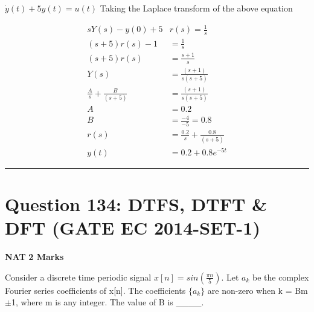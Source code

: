 \documentclass[11pt,a4paper]{article}
\begin{document}
\begin{tcolorbox}[solbox, title=Detailed Solution -- Question 133]
$\dot{y}(t)+5 y(t)=u(t)$
 Taking the Laplace transform of the above equation

\[
\begin{aligned} s Y(s)-y(0)+5 & r(s)=\frac{1}{s} \\ (s+5) r(s)-1 & =\frac{1}{s} \\ (s+5) r(s) & =\frac{s+1}{s} \\ Y(s) & =\frac{(s+1)}{s(s+5)} \\ \frac{A}{s}+\frac{B}{(s+5)} & =\frac{(s+1)}{s(s+5)} \\ A&=0.2 \\ B&=\frac{-4}{-5}=0.8 \\ r(s) &=\frac{0.2}{s}+\frac{0.8}{(s+5)}\\ y(t)&=0.2+0.8 e^{-5 t} \end{aligned}
\]
\end{tcolorbox}

\vspace{1.5em}
\hrule
\vspace{1.5em}

\section*{Question 134: DTFS, DTFT \& DFT (GATE EC 2014-SET-1)}
\noindent \textbf{\color{primary}NAT} \hfill \textbf{\color{secondary}2 Marks}


\noindent Consider a discrete time periodic signal $x[n]=sin(\frac{\pi n}{5})$. Let $a_{k}$ be the complex Fourier series coefficients of x[n]. The coefficients $\{a_{k}\}$ are non-zero when
k = Bm${\pm }$1, where m is any integer. The value of B is \_\_\_\_.
\end{document}

